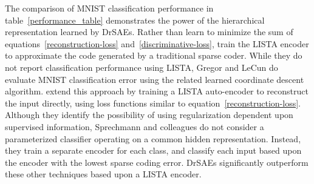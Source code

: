 \documentclass{article} %
\begin{document}


The comparison of MNIST classification performance in table~\ref{performance_table} demonstrates the power of the hierarchical %
representation learned by DrSAEs. %
Rather than learn to minimize the sum of equations~\ref{reconstruction-loss} and~\ref{discriminative-loss}, \citet{gregor2010} train the LISTA encoder to approximate the code generated by a traditional sparse coder. %
While they do not report classification performance using LISTA, Gregor and LeCun do evaluate MNIST classification error using the related learned coordinate descent algorithm.
\citet{sprechmann2012a, sprechmann2012b} extend this approach by training a LISTA auto-encoder to reconstruct the input directly, using loss functions similar to equation~\ref{reconstruction-loss}. 
Although they identify the possibility of using regularization dependent upon supervised information, Sprechmann and colleagues do not consider a parameterized classifier operating on a common hidden representation. %
Instead, they train a separate encoder for each class, and classify each input based upon the encoder with the lowest sparse coding error.  %
DrSAEs significantly outperform these other techniques based upon a LISTA encoder.
\end{document}
